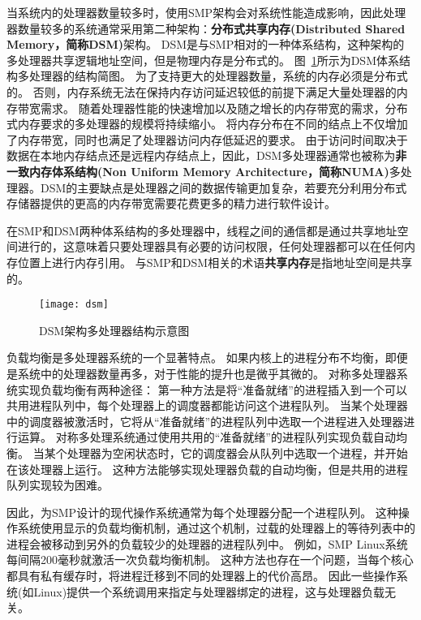	当系统内的处理器数量较多时，使用SMP架构会对系统性能造成影响，因此处理器数量较多的系统通常采用第二种架构：\textbf{分布式共享内存(Distributed Shared Memory，简称DSM)}架构。
	DSM是与SMP相对的一种体系结构，这种架构的多处理器共享逻辑地址空间，但是物理内存是分布式的。
	图~\ref{fig:dsm}所示为DSM体系结构多处理器的结构简图。
	为了支持更大的处理器数量，系统的内存必须是分布式的。
	否则，内存系统无法在保持内存访问延迟较低的前提下满足大量处理器的内存带宽需求。
	随着处理器性能的快速增加以及随之增长的内存带宽的需求，分布式内存要求的多处理器的规模将持续缩小。
	将内存分布在不同的结点上不仅增加了内存带宽，同时也满足了处理器访问内存低延迟的要求。
	由于访问时间取决于数据在本地内存结点还是远程内存结点上，因此，DSM多处理器通常也被称为\textbf{非一致内存体系结构(Non Uniform Memory Architecture，简称NUMA)}多处理器。DSM的主要缺点是处理器之间的数据传输更加复杂，若要充分利用分布式存储器提供的更高的内存带宽需要花费更多的精力进行软件设计。

在SMP和DSM两种体系结构的多处理器中，线程之间的通信都是通过共享地址空间进行的，这意味着只要处理器具有必要的访问权限，任何处理器都可以在任何内存位置上进行内存引用。
与SMP和DSM相关的术语\textbf{共享内存}是指地址空间是共享的。

\begin{figure}
\centering
\texttt{[image: dsm]}
\caption{DSM架构多处理器结构示意图}
\label{fig:dsm}
\end{figure}


负载均衡是多处理器系统的一个显著特点。
如果内核上的进程分布不均衡，即便是系统中的处理器数量再多，对于性能的提升也是微乎其微的。
对称多处理器系统实现负载均衡有两种途径：
第一种方法是将“准备就绪”的进程插入到一个可以共用进程队列中，每个处理器上的调度器都能访问这个进程队列。
当某个处理器中的调度器被激活时，它将从“准备就绪”的进程队列中选取一个进程进入处理器进行运算。
对称多处理系统通过使用共用的“准备就绪”的进程队列实现负载自动均衡。
当某个处理器为空闲状态时，它的调度器会从队列中选取一个进程，并开始在该处理器上运行。
这种方法能够实现处理器负载的自动均衡，但是共用的进程队列实现较为困难。

因此，为SMP设计的现代操作系统通常为每个处理器分配一个进程队列。
这种操作系统使用显示的负载均衡机制，通过这个机制，过载的处理器上的等待列表中的进程会被移动到另外的负载较少的处理器的进程队列中。
例如，SMP Linux系统每间隔200毫秒就激活一次负载均衡机制\cite{bolla2008effective}。
这种方法也存在一个问题，当每个核心都具有私有缓存时，将进程迁移到不同的处理器上的代价高昂。
因此一些操作系统(如Linux)提供一个系统调用来指定与处理器绑定的进程，这与处理器负载无关。


